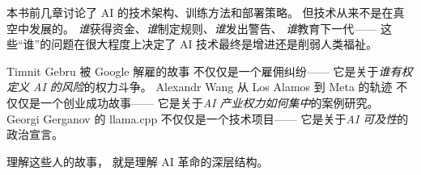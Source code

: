 \begin{whybox}
本书前几章讨论了 AI 的技术架构、训练方法和部署策略。
但技术从来不是在真空中发展的。
\emph{谁}获得资金、\emph{谁}制定规则、\emph{谁}发出警告、
\emph{谁}教育下一代——
这些``谁''的问题在很大程度上决定了
AI 技术最终是增进还是削弱人类福祉。

Timnit Gebru 被 Google 解雇的故事
不仅仅是一个雇佣纠纷——
它是关于\emph{谁有权定义 AI 的风险}的权力斗争。
Alexandr Wang 从 Los Alamos 到 Meta 的轨迹
不仅仅是一个创业成功故事——
它是关于\emph{AI 产业权力如何集中}的案例研究。
Georgi Gerganov 的 llama.cpp
不仅仅是一个技术项目——
它是关于\emph{AI 可及性}的政治宣言。

理解这些人的故事，
就是理解 AI 革命的深层结构。
\end{whybox}
